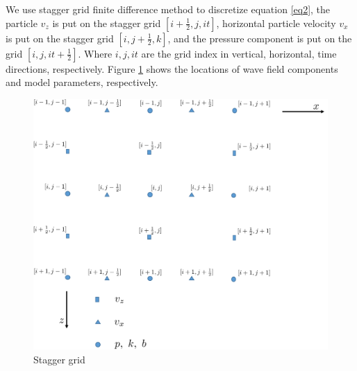 \documentclass[revised,endfloat]{geophysics}
\begin{document}
We use stagger grid finite difference method to discretize equation \ref{eq2}, the particle $v_z$ is put on the stagger grid $[i+\frac{1}{2},j,it]$, horizontal particle velocity $v_x$ is put on the stagger grid $[i, j+\frac{1}{2}, k]$, and the pressure component is put on the grid $[i,j,it+\frac{1}{2}]$. Where $i,j,it$ are the grid index in vertical, horizontal, time directions, respectively. Figure \ref{f1} shows the locations of wave field components and model parameters, respectively.
\begin{figure}[htb] 
   \centering
   \includegraphics[width=0.6\columnwidth]{Fig/f1.pdf} 
   \caption{Stagger grid}
   \label{f1}
\end{figure}
\end{document}
